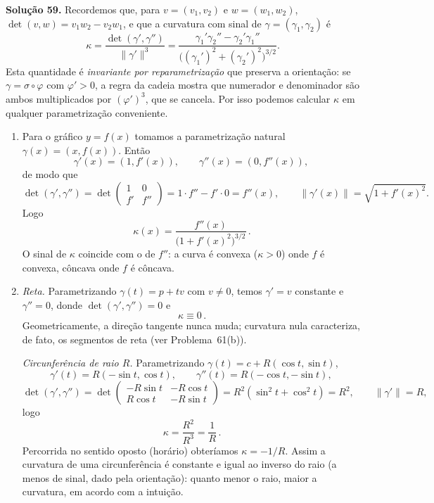 \bigskip\noindent\textbf{Solução 59.}\quad
Recordemos que, para $v=(v_1,v_2)$ e $w=(w_1,w_2)$, $\det(v,w)=v_1w_2-v_2w_1$, e que a curvatura com sinal de $\gamma=(\gamma_1,\gamma_2)$ é
\[
\kappa=\frac{\det(\gamma',\gamma'')}{\|\gamma'\|^3}
=\frac{\gamma_1'\gamma_2''-\gamma_2'\gamma_1''}{\big((\gamma_1')^2+(\gamma_2')^2\big)^{3/2}} .
\]
Esta quantidade é \emph{invariante por reparametrização} que preserva a orientação: se $\gamma=\sigma\circ\varphi$ com $\varphi'>0$, a regra da cadeia mostra que numerador e denominador são ambos multiplicados por $(\varphi')^3$, que se cancela. Por isso podemos calcular $\kappa$ em qualquer parametrização conveniente.

\begin{enumerate}[label=(\alph*)]

\item Para o gráfico $y=f(x)$ tomamos a parametrização natural $\gamma(x)=(x,f(x))$. Então
\[
\gamma'(x)=(1,f'(x)),\qquad \gamma''(x)=(0,f''(x)),
\]
de modo que
\[
\det(\gamma',\gamma'')=\det\begin{pmatrix}1&0\\ f'&f''\end{pmatrix}=1\cdot f''-f'\cdot0=f''(x),
\qquad
\|\gamma'(x)\|=\sqrt{1+f'(x)^2}.
\]
Logo
\[
\boxed{\,\kappa(x)=\dfrac{f''(x)}{\bigl(1+f'(x)^2\bigr)^{3/2}}\,}.
\]
O sinal de $\kappa$ coincide com o de $f''$: a curva é convexa ($\kappa>0$) onde $f$ é convexa, côncava onde $f$ é côncava.

\item \emph{Reta.} Parametrizando $\gamma(t)=p+tv$ com $v\neq0$, temos $\gamma'=v$ constante e $\gamma''=0$, donde $\det(\gamma',\gamma'')=0$ e
\[
\boxed{\,\kappa\equiv0\,}.
\]
Geometricamente, a direção tangente nunca muda; curvatura nula caracteriza, de fato, os segmentos de reta (ver Problema~61(b)).

\emph{Circunferência de raio $R$.} Parametrizando $\gamma(t)=c+R(\cos t,\sin t)$,
\[
\gamma'(t)=R(-\sin t,\cos t),\qquad \gamma''(t)=R(-\cos t,-\sin t),
\]
\[
\det(\gamma',\gamma'')
=\det\begin{pmatrix}-R\sin t&-R\cos t\\ R\cos t&-R\sin t\end{pmatrix}
=R^2(\sin^2t+\cos^2t)=R^2,
\qquad \|\gamma'\|=R,
\]
logo
\[
\boxed{\,\kappa=\dfrac{R^2}{R^3}=\dfrac1R\,}.
\]
Percorrida no sentido oposto (horário) obteríamos $\kappa=-1/R$. Assim a curvatura de uma circunferência é constante e igual ao inverso do raio (a menos de sinal, dado pela orientação): quanto menor o raio, maior a curvatura, em acordo com a intuição.


\end{enumerate}
